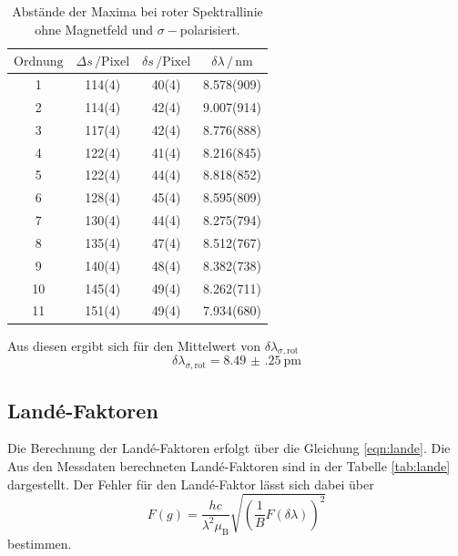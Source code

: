 \begin{table}
    \centering
    \caption{Abstände der Maxima bei roter Spektrallinie ohne Magnetfeld und $\sigma-$polarisiert.}
    \label{tab:maxima_rot_sigma}
    \begin{tabular}{S S S S}
        \toprule
        $\text{Ordnung}$ & $\Delta s \, /\text{Pixel}$  & $\delta s \, /\text{Pixel}$ & $\delta\lambda \, / \, \si{\nano\meter}$  \\
          & 114(4) & 40(4)  &  8.578(909) \\ 
        2  & 114(4) & 42(4)  &  9.007(914) \\
        3  & 117(4) & 42(4)  &  8.776(888) \\
        4  & 122(4) & 41(4)  &  8.216(845) \\
        5  & 122(4) & 44(4)  &  8.818(852) \\ 
        6  & 128(4) & 45(4)  &  8.595(809) \\
        7  & 130(4) & 44(4)  &  8.275(794) \\
        8  & 135(4) & 47(4)  &  8.512(767) \\
        9  & 140(4) & 48(4)  &  8.382(738) \\
        10 & 145(4) & 49(4)  &  8.262(711) \\
        11 & 151(4) & 49(4)  &  7.934(680) \\
        \bottomrule

    \end{tabular}
\end{table}

Aus diesen ergibt sich für den Mittelwert von $\delta\lambda_{\sigma,\text{rot}}$
\begin{equation}
    \delta\lambda_{\sigma,\text{rot}} = \SI{8.49(25)}{\pico\m}
\end{equation}

\subsection{Landé-Faktoren}

Die Berechnung der Landé-Faktoren erfolgt über die Gleichung \ref{eqn:lande}. Die Aus den Messdaten berechneten Landé-Faktoren  
sind in der Tabelle \ref{tab:lande} dargestellt. Der Fehler für den Landé-Faktor lässt sich dabei über 
\begin{equation}
    F(g) = \frac{hc}{\lambda^2 \mu _\text{B}} \sqrt{\left ( \frac{1}{B} F(\delta \lambda) \right)^2}
\end{equation} bestimmen. 

